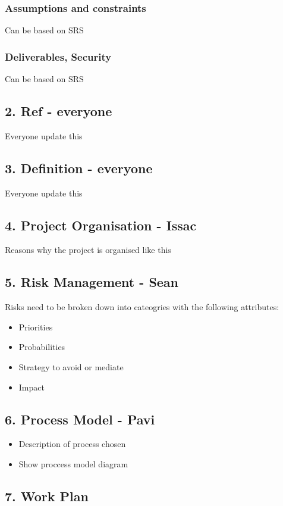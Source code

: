 \documentclass[11pt, a4paper]{article}
\begin{document}
	\subsubsection*{Assumptions and constraints}
	Can be based on SRS
	
	\subsubsection*{Deliverables, Security}
	Can be based on SRS
	
	\subsection*{2. Ref - everyone}
	Everyone update this
	
	\subsection*{3. Definition - everyone}
	Everyone update this

	\subsection*{4. Project Organisation - Issac}
	Reasons why the project is organised like this
	
	\subsection*{5. Risk Management - Sean}
	Risks need to be broken down into cateogries with the following attributes:
	\begin{itemize}
		\item Priorities
		\item Probabilities
		\item Strategy to avoid or mediate
		\item Impact
	\end{itemize}
	
	\subsection*{6. Process Model - Pavi}
	\begin{itemize}
		\item Description of process chosen
		\item Show proccess model diagram
	\end{itemize}
	
	\subsection*{7. Work Plan}
\end{document}
